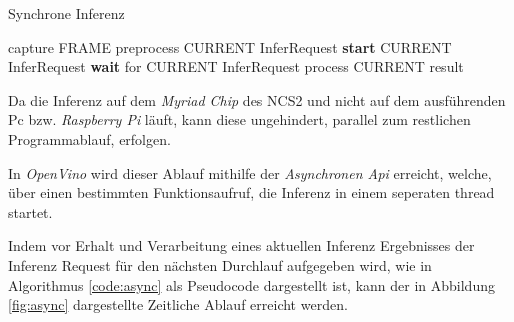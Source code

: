 \vspace{1cm}
\begin{minipage}{0.1\textwidth}
  \hfill
\end{minipage}
\begin{minipage}{0.5\textwidth}
  \begin{algorithm}[H]
    \caption{Synchrone Inferenz}
    \label{code:sync}
    \begin{algorithmic}
    \WHILE{\TRUE}
        \STATE capture FRAME
        \STATE preprocess CURRENT InferRequest
        \STATE \textbf{start} CURRENT InferRequest
        \STATE \textbf{wait} for CURRENT InferRequest
        \STATE process CURRENT result
    \ENDWHILE
    \end{algorithmic}
  \end{algorithm}  
\end{minipage}
\begin{minipage}{0.4\textwidth}
  \centering
  \vspace{1cm}
  \def\svgwidth{0.5\textwidth}
  
\end{minipage}

\vspace{1cm}
\begin{figure}[H]
  \centering
  \def\svgwidth{0.9\textwidth}
  
  \caption{}
  \label{fig:sync}
\end{figure}


Da die Inferenz auf dem \textit{Myriad Chip} des NCS2
und nicht auf dem ausführenden Pc bzw. \textit{Raspberry Pi} läuft,
kann diese ungehindert, parallel zum restlichen Programmablauf, 
erfolgen.

In \textit{OpenVino} wird dieser Ablauf mithilfe
 der \textit{Asynchronen Api}
erreicht, welche, über einen bestimmten Funktionsaufruf,
die Inferenz in einem seperaten \Gls{thread} startet.

Indem vor Erhalt und Verarbeitung eines aktuellen 
Inferenz Ergebnisses der Inferenz Request für
den nächsten Durchlauf aufgegeben wird, wie in Algorithmus
\ref{code:async} als Pseudocode dargestellt ist, kann der in
Abbildung \ref{fig:async} dargestellte Zeitliche Ablauf
erreicht werden.
\vspace{1cm}

